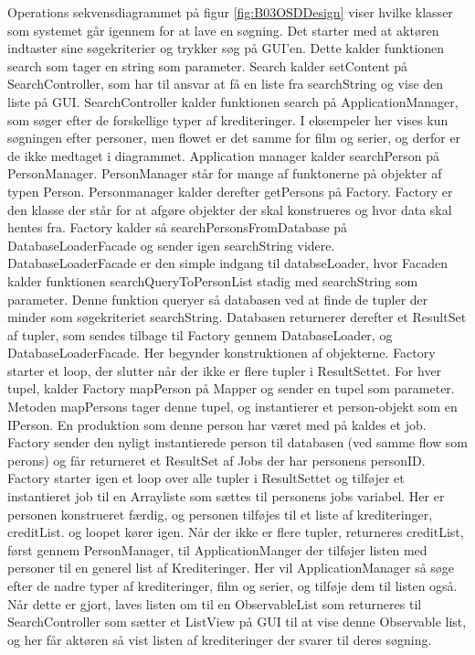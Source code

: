 Operations sekvensdiagrammet på figur \ref{fig:B03OSDDesign} viser hvilke klasser som systemet går igennem for at lave en søgning. Det starter med at aktøren indtaster sine søgekriterier og trykker søg på GUI'en. Dette kalder funktionen search som tager en string som parameter. Search kalder setContent på SearchController, som har til ansvar at få en liste fra searchString og vise den liste på GUI. SearchController kalder funktionen search på ApplicationManager, som søger efter de forskellige typer af krediteringer. I eksempeler her vises kun søgningen efter personer, men flowet er det samme for film og serier, og derfor er de ikke medtaget i diagrammet. Application manager kalder searchPerson på PersonManager. PersonManager står for mange af funktonerne på objekter af typen Person. Personmanager kalder derefter getPersons på Factory. Factory er den klasse der står for at afgøre objekter der skal konstrueres og hvor data skal hentes fra. Factory kalder så searchPersonsFromDatabase på DatabaseLoaderFacade og sender igen searchString videre. DatabaseLoaderFacade er den simple indgang til databseLoader, hvor Facaden kalder funktionen searchQueryToPersonList stadig med searchString som parameter. Denne funktion queryer så databasen ved at finde de tupler der minder som søgekriteriet searchString. Databasen returnerer derefter et ResultSet af tupler, som sendes tilbage til Factory gennem DatabaseLoader, og DatabaseLoaderFacade. Her begynder konstruktionen af objekterne. Factory starter et loop, der slutter når der ikke er flere tupler i ResultSettet. For hver tupel, kalder Factory mapPerson på Mapper og sender en tupel som parameter. Metoden mapPersons tager denne tupel, og instantierer et person-objekt som en IPerson. En produktion som denne person har været med på kaldes et job. Factory sender den nyligt instantierede person til databasen (ved samme flow som perons) og får returneret et ResultSet af Jobs der har personens personID. Factory starter igen et loop over alle tupler i ResultSettet og tilføjer et instantieret job til en Arrayliste som sættes til personens jobs variabel. Her er personen konstrueret færdig, og personen tilføjes til et liste af krediteringer, creditList. og loopet kører igen. Når der ikke er flere tupler, returneres creditList, først gennem PersonManager, til ApplicationManger der tilføjer listen med personer til en generel list af Krediteringer. Her vil ApplicationManager så søge efter de nadre typer af krediteringer, film og serier, og tilføje dem til listen også. Når dette er gjort, laves listen om til en ObservableList som returneres til SearchController som sætter et ListView på GUI til at vise denne Observable list, og her får aktøren så vist listen af krediteringer der svarer til deres søgning.